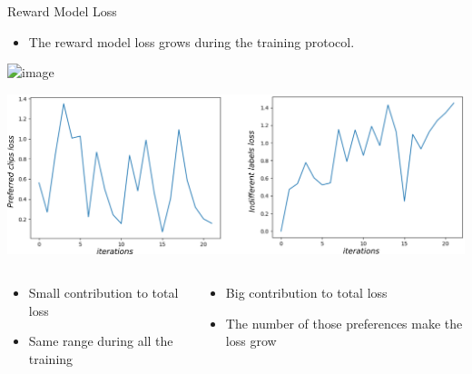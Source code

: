 \begin{frame}{Reward Model Loss}

    \begin{itemize}
        \item The reward model loss grows during the training protocol.
    \end{itemize}
    \centering
    \vspace{0.4cm}
    \includegraphics<1>[width=0.6\linewidth]{images/reward_loss.png}
    
    
\end{frame}

\begin{frame}{}
\centering
\includegraphics[width=1\linewidth]{images/bothlosses.png}

\begin{adjustwidth}{-2em}{-2em}
    \begin{columns}
        \begin{column}{0.5\textwidth}
        \small{        
            \begin{itemize}
                \item Small contribution to total loss
                \item Same range during all the training
            \end{itemize}
        }
            
        \end{column}
        \begin{column}{0.5\textwidth}
        \small{
            \begin{itemize}
                \item Big contribution to total loss
                \item The number of those preferences make the loss grow
            \end{itemize}
        }
        
        \end{column}
        
    \end{columns}
\end{adjustwidth}
\end{frame}

